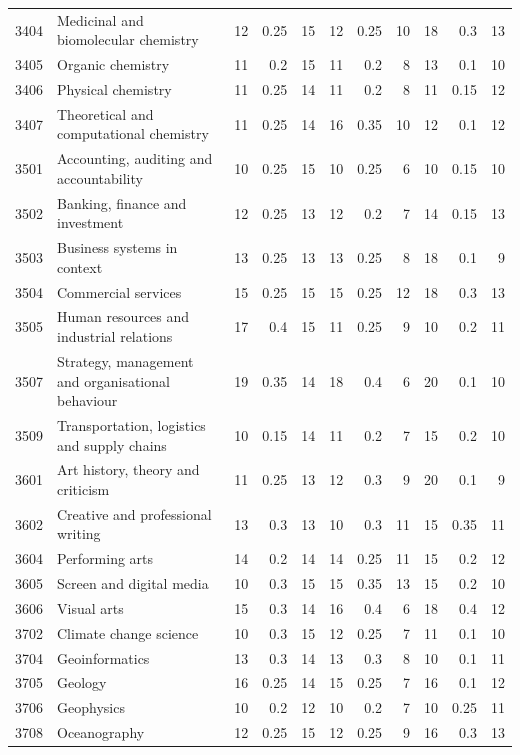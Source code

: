 \begin{longtable}{r p{2.15cm} rrr rrr rrr}
3404 & Medicinal and biomolecular chemistry & 12 & 0.25 & 15 & 12 & 0.25 & 10 & 18 & 0.3 & 13 \\
3405 & Organic chemistry & 11 & 0.2 & 15 & 11 & 0.2 & 8 & 13 & 0.1 & 10 \\
3406 & Physical chemistry & 11 & 0.25 & 14 & 11 & 0.2 & 8 & 11 & 0.15 & 12 \\
3407 & Theoretical and computational chemistry & 11 & 0.25 & 14 & 16 & 0.35 & 10 & 12 & 0.1 & 12 \\
3501 & Accounting, auditing and accountability & 10 & 0.25 & 15 & 10 & 0.25 & 6 & 10 & 0.15 & 10 \\
3502 & Banking, finance and investment & 12 & 0.25 & 13 & 12 & 0.2 & 7 & 14 & 0.15 & 13 \\
3503 & Business systems in context & 13 & 0.25 & 13 & 13 & 0.25 & 8 & 18 & 0.1 & 9 \\
3504 & Commercial services & 15 & 0.25 & 15 & 15 & 0.25 & 12 & 18 & 0.3 & 13 \\
3505 & Human resources and industrial relations & 17 & 0.4 & 15 & 11 & 0.25 & 9 & 10 & 0.2 & 11 \\
3507 & Strategy, management and organisational behaviour & 19 & 0.35 & 14 & 18 & 0.4 & 6 & 20 & 0.1 & 10 \\
3509 & Transportation, logistics and supply chains & 10 & 0.15 & 14 & 11 & 0.2 & 7 & 15 & 0.2 & 10 \\
3601 & Art history, theory and criticism & 11 & 0.25 & 13 & 12 & 0.3 & 9 & 20 & 0.1 & 9 \\
3602 & Creative and professional writing & 13 & 0.3 & 13 & 10 & 0.3 & 11 & 15 & 0.35 & 11 \\
3604 & Performing arts & 14 & 0.2 & 14 & 14 & 0.25 & 11 & 15 & 0.2 & 12 \\
3605 & Screen and digital media & 10 & 0.3 & 15 & 15 & 0.35 & 13 & 15 & 0.2 & 10 \\
3606 & Visual arts & 15 & 0.3 & 14 & 16 & 0.4 & 6 & 18 & 0.4 & 12 \\
3702 & Climate change science & 10 & 0.3 & 15 & 12 & 0.25 & 7 & 11 & 0.1 & 10 \\
3704 & Geoinformatics & 13 & 0.3 & 14 & 13 & 0.3 & 8 & 10 & 0.1 & 11 \\
3705 & Geology & 16 & 0.25 & 14 & 15 & 0.25 & 7 & 16 & 0.1 & 12 \\
3706 & Geophysics & 10 & 0.2 & 12 & 10 & 0.2 & 7 & 10 & 0.25 & 11 \\
3708 & Oceanography & 12 & 0.25 & 15 & 12 & 0.25 & 9 & 16 & 0.3 & 13 \\

\end{longtable}

